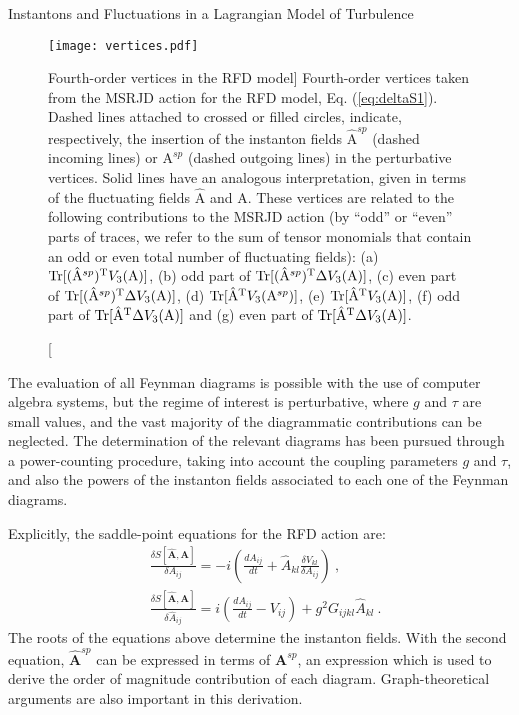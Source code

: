 \begin{chapter}{Instantons and Fluctuations in a Lagrangian Model of Turbulence}
\begin{figure}[ht]
    \centering
    \texttt{[image: vertices.pdf]}
    \caption
    [Fourth-order vertices in the RFD model]
    {Fourth-order vertices taken from the MSRJD action for the RFD model, Eq. (\ref{eq:deltaS1}). Dashed lines attached to crossed or filled circles, 
    indicate, respectively, the insertion of the instanton fields $ \hat {\mathrm{A}}^{sp}$ (dashed incoming lines) or
    ${\mathrm{A}}^{sp}$ (dashed outgoing lines) in the perturbative vertices. Solid lines have an analogous interpretation, given in
    terms of the fluctuating fields $ \hat {\mathrm{A}}$ and ${\mathrm{A}}$. These vertices are related to the following contributions to the MSRJD action (by ``odd'' or ``even'' parts of traces, we refer to the sum of tensor monomials that contain an odd or even total number of fluctuating fields): 
    (a) $ \mathrm{Tr} [ (\hat {\mathrm{A}}^{sp})^{\mathrm{T}} V_3({\mathrm{A}}) ] $,
    (b) odd part of $ \mathrm{Tr} [  ( \hat {\mathrm{A}}^{sp})^{\mathrm{T}} \Delta V_3({\mathrm{A}}) ]$,
    (c) even part of $ \mathrm{Tr} [  ( \hat {\mathrm{A}}^{sp})^{\mathrm{T}} \Delta V_3({\mathrm{A}}) ]$,
    (d) $ \mathrm{Tr} [ \hat {\mathrm{A}}^{\mathrm{T}} V_3 ({\mathrm{A}}^{sp})] $,
    (e) $ \mathrm{Tr} [ \hat {\mathrm{A}}^{\mathrm{T}} V_3({\mathrm{A}}) ] $,
    (f) odd part of $ \mathrm{Tr} [ \hat {\mathrm{A}}^{\mathrm{T}} \Delta V_3({\mathrm{A}}) ] $ and
    (g) even part of $ \mathrm{Tr} [ \hat {\mathrm{A}}^{\mathrm{T}} \Delta V_3({\mathrm{A}}) ] $.}
  \label{fig:Vertices}
\end{figure}

The evaluation of all Feynman diagrams is possible with the use of computer algebra systems, but the regime of interest is perturbative, where $g$ and $\tau$ are small values, and the vast majority of the diagrammatic contributions can be neglected. The determination of the relevant diagrams has been pursued through a power-counting procedure, taking into account the coupling parameters $g$ and $\tau$, and also the powers of the instanton fields associated to each one of the Feynman diagrams.

Explicitly, the saddle-point equations for the RFD action are:
\begin{equation} \label{eq:rfd-saddle}
    \begin{split}
        &\frac{\delta S[\hat {\mathbf{A}}, {\mathbf{A}}]}{\delta A_{ij}} =
        -i \left( \frac{d \hat A_{ij}}{dt} + \hat A_{kl} \frac{\delta V_{kl}}{\delta A_{ij}} \right) \ , \\
        &\frac{\delta S[\hat {\mathbf{A}}, {\mathbf{A}}]}{\delta \hat A_{ij}} =
        i \left( \frac{d A_{ij}}{dt} - V_{ij} \right) + g^2 G_{ijkl} \hat A_{kl} \ .
    \end{split}
\end{equation}
The roots of the equations above determine the instanton fields. With the second equation, $\hat {\mathbf{A}}^{sp}$ can be expressed in terms of ${\mathbf{A}}^{sp}$, an expression which is used to derive the order of magnitude contribution of each diagram. Graph-theoretical arguments are also important in this derivation.


\end{chapter}
